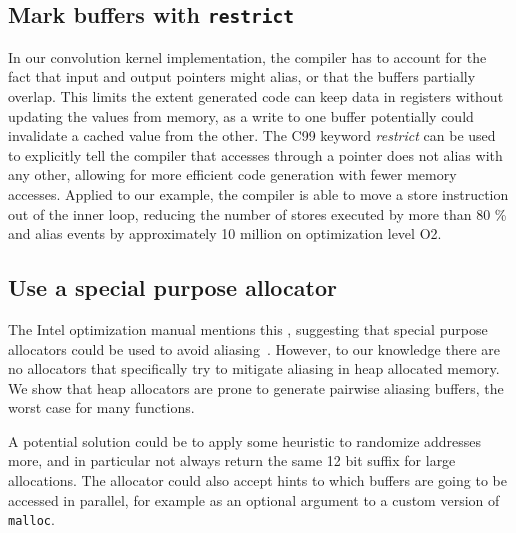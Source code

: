 \documentclass[10pt, conference, compsocconf]{IEEEtran}
\begin{document}
\subsection{Mark buffers with \texttt{restrict}}
In our convolution kernel implementation, the compiler has to account for the fact that input and output pointers might alias, or that the buffers partially overlap.
This limits the extent generated code can keep data in registers without updating the values from memory, as a write to one buffer potentially could invalidate a cached value from the other.
The C99 keyword \emph{restrict} can be used to explicitly tell the compiler that accesses through a pointer does not alias with any other, allowing for more efficient code generation with fewer memory accesses.
Applied to our example, the compiler is able to move a store instruction out of the inner loop, reducing the number of stores executed by more than 80 \% and alias events by approximately 10 million on optimization level O2.

\subsection{Use a special purpose allocator}
The Intel optimization manual mentions this%
, suggesting that special purpose allocators could be used to avoid aliasing~\cite{OptimizationManual}.
However, to our knowledge there are no allocators that specifically try to mitigate aliasing in heap allocated memory.
We show that heap allocators are prone to generate pairwise aliasing buffers, the worst case for many functions.


A potential solution could be to apply some heuristic to randomize addresses more, and in particular not always return the same 12 bit suffix for large allocations.
The allocator could also accept hints to which buffers are going to be accessed in parallel, for example as an optional argument to a custom version of \texttt{malloc}.
\end{document}
